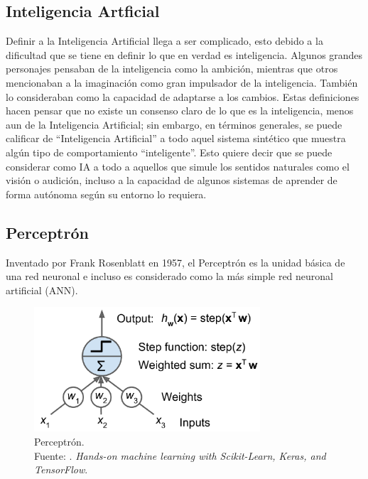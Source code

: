 \subsection{Inteligencia Artficial}
Definir a la Inteligencia Artificial llega a ser complicado, esto debido a la dificultad que se tiene en definir lo que en verdad es inteligencia. Algunos grandes personajes pensaban de la inteligencia como la ambición, mientras que otros mencionaban a la imaginación como gran impulsador de la inteligencia. También lo consideraban como la capacidad de adaptarse a los cambios. Estas definiciones hacen pensar que no existe un consenso claro de lo que es la inteligencia, menos aun de la Inteligencia Artificial; sin embargo, en términos generales, se puede calificar de “Inteligencia Artificial” a todo aquel sistema sintético que muestra algún tipo de comportamiento “inteligente”. Esto quiere decir que se puede considerar como IA a todo a aquellos que simule los sentidos naturales como el visión o audición, incluso a la capacidad de algunos sistemas de aprender de forma autónoma según su entorno lo requiera. \parencite{bk_hurbans2020grokking}

\subsection{Perceptrón}
Inventado por Frank Rosenblatt en 1957, el Perceptrón es la unidad básica de una red neuronal e incluso es considerado como la más simple red neuronal artificial (ANN). \parencite{bk_geron2022handml}

\begin{figure}[H]
	\begin{center}
		\includegraphics[width=0.75\textwidth]{2/figures/perceptron.png}
		\caption[Perceptrón]{Perceptrón. \\
		Fuente: \cite{bk_geron2022handml}. \textit{Hands-on machine learning with Scikit-Learn, Keras, and TensorFlow}.}
		\label{2:fig207}
	\end{center}
\end{figure}


